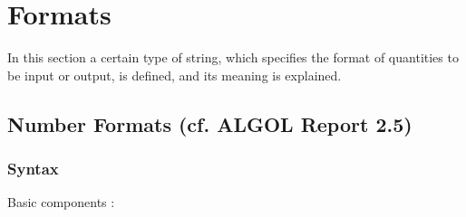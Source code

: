 \documentclass[a4paper,11pt]{article}
\begin{document}
\section{Formats}
\label{Lbl++Formats}

In this section a certain type of string, which specifies the format
of quantities to be input or output, is defined, and its meaning is
explained.

\subsection[Number Formats]{Number Formats (cf. ALGOL Report 2.5)}

\subsubsection{Syntax}

Basic components :
\end{document}
